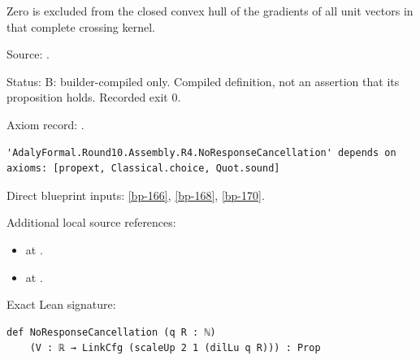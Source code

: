 \begin{definition}[bp-171]
\label{bp-171}
\leanok
Zero is excluded from the closed convex hull of the gradients of all unit vectors in that complete crossing kernel.

\par Source: \texttt{}.
\par Status: B: builder-compiled only. Compiled definition, not an assertion that its proposition holds. Recorded exit 0.
\par Axiom record: \texttt{}.
\begin{verbatim}
'AdalyFormal.Round10.Assembly.R4.NoResponseCancellation' depends on axioms: [propext, Classical.choice, Quot.sound]
\end{verbatim}
\par Direct blueprint inputs: \ref{bp-166}, \ref{bp-168}, \ref{bp-170}.
\par Additional local source references:
\begin{itemize}
\item \texttt{} at \texttt{}.
\item \texttt{} at \texttt{}.
\end{itemize}
\par Exact Lean signature:
\begin{verbatim}
def NoResponseCancellation (q R : ℕ)
    (V : ℝ → LinkCfg (scaleUp 2 1 (dilLu q R))) : Prop
\end{verbatim}
\end{definition}

